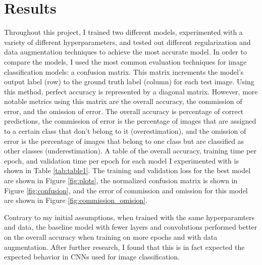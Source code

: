 \documentclass[11pt,a4paper]{article}
\begin{document}
\section{Results}

Throughout this project, I trained two different models, experimented with a variety of different hyperparameters,
 and tested out different regularization and data augmentation techniques to achieve the most accurate model. In order 
 to compare the models, I used the most common evaluation techniques for image classification models: a confusion matrix. 
 This matrix increments the model’s output label (row) to the ground truth label (column) for each test image. Using this
 method, perfect accuracy is represented by a diagonal matrix. However, more notable metrics using this matrix are the 
 overall accuracy, the commission of error, and the omission of error. The overall accuracy is percentage of correct 
 predictions, the commission of error is the percentage of images that are assigned to a certain class that don't belong 
 to it (overestimation), and the omission of error is the percentage of images that belong to one class but are classified 
 as other classes (underestimation). A table of the overall accuracy, training time per epoch, and validation time per epoch 
 for each model I experimented with is shown in Table \ref{tab:table1}. The training and validation loss for the best model 
 are shown in Figure \ref{fig:plots}, the normalized confusion matrix is shown in Figure \ref{fig:confusion}, and the error of commission
  and omission for this model are shown in Figure \ref{fig:commission_omision}.

Contrary to my initial assumptions, when trained with the same hyperparamters and data, the baseline model with 
 fewer layers and convolutions performed better on the overall accuracy when training on more epochs and with data 
 augmentation. After further research, I found that this is in fact expected the expected behavior in CNNs used for 
 image classification.
\end{document}
